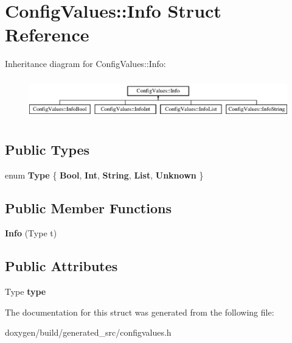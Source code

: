 \hypertarget{struct_config_values_1_1_info}{}\section{Config\+Values\+::Info Struct Reference}
\label{struct_config_values_1_1_info}
Inheritance diagram for Config\+Values\+::Info\+:\begin{figure}[H]
\begin{center}
\leavevmode
\includegraphics[height=1.794872cm]{struct_config_values_1_1_info}
\end{center}
\end{figure}
\subsection*{Public Types}
\begin{DoxyCompactItemize}
\item 
\mbox{\label{struct_config_values_1_1_info_a9a69578a9080f48e9fac8c186b9265be}} 
enum {\bfseries Type} \{ \newline
{\bfseries Bool}, 
{\bfseries Int}, 
{\bfseries String}, 
{\bfseries List}, 
\newline
{\bfseries Unknown}
 \}
\end{DoxyCompactItemize}
\subsection*{Public Member Functions}
\begin{DoxyCompactItemize}
\item 
\mbox{\label{struct_config_values_1_1_info_ad9dc92f541892b4337771b826e7901ad}} 
{\bfseries Info} (Type t)
\end{DoxyCompactItemize}
\subsection*{Public Attributes}
\begin{DoxyCompactItemize}
\item 
\mbox{\label{struct_config_values_1_1_info_ab022fca59ea758ffa0d4be01fc3e942a}} 
Type {\bfseries type}
\end{DoxyCompactItemize}


The documentation for this struct was generated from the following file\+:\begin{DoxyCompactItemize}
\item 
doxygen/build/generated\+\_\+src/configvalues.\+h\end{DoxyCompactItemize}
